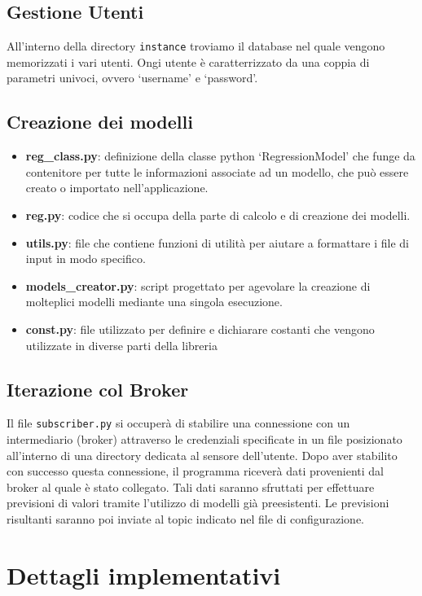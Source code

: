\documentclass{rapportECL}
\begin{document}
\section{Gestione Utenti}
All'interno della directory \texttt{instance} troviamo il database nel quale vengono memorizzati i vari utenti. Ongi utente è caratterrizzato
da una coppia di parametri univoci, ovvero `username' e `password'. 

\section{Creazione dei modelli}
\begin{itemize}
  \item \textbf{reg\_class.py}: definizione della classe python `RegressionModel' che funge da contenitore per tutte le
  informazioni associate ad un modello, che può essere creato o importato nell'applicazione.
  \item \textbf{reg.py}: codice che si occupa della parte di calcolo e di creazione dei modelli.
  \item \textbf{utils.py}: file che contiene funzioni di utilità per aiutare a formattare i file di input in modo specifico.
  \item \textbf{models\_creator.py}: script progettato per agevolare la creazione di molteplici modelli mediante una singola esecuzione.
  \item \textbf{const.py}: file utilizzato per definire e dichiarare costanti che vengono utilizzate in diverse parti della libreria
\end{itemize}

\section{Iterazione col Broker}
Il file \texttt{subscriber.py} si occuperà di stabilire una connessione con un intermediario (broker) attraverso le credenziali specificate in 
un file posizionato all'interno di una directory dedicata al sensore dell'utente. Dopo aver stabilito con successo questa connessione, il programma riceverà 
dati provenienti dal broker al quale è stato collegato. Tali dati saranno sfruttati per effettuare previsioni di valori tramite l'utilizzo di modelli già preesistenti. 
Le previsioni risultanti saranno poi inviate al topic indicato nel file di configurazione.


\chapter{Dettagli implementativi}
\end{document}
